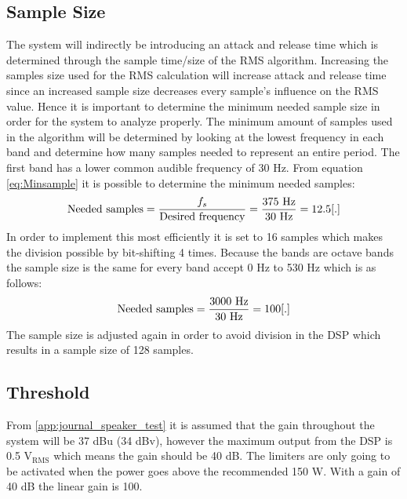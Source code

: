 \subsection*{Sample Size}
The system will indirectly be introducing an attack and release time which is determined through the sample time/size of the RMS algorithm. Increasing the samples size used for the RMS calculation will increase attack and release time since an increased sample size decreases every sample's influence on the RMS value. Hence it is important to determine the minimum needed sample size in order for the system to analyze properly. The minimum amount of samples used in the algorithm will be determined by looking at the lowest frequency in each band and determine how many samples needed to represent an entire period. The first band has a lower common audible frequency of 30 Hz. From equation \ref{eq:Minsample} it is possible to determine the minimum needed samples:
\begin{equation}\label{eq:Minsample}
\text{Needed samples} = \frac{f_s}{\text{Desired frequency}} = \frac{375 \text{ Hz}}{30 \text{ Hz}} = 12.5 \enhed{.}
\end{equation} 
In order to implement this most efficiently it is set to 16 samples which makes the division possible by bit-shifting 4 times. Because the bands are octave bands the sample size is the same for every band accept 0 Hz to 530 Hz which is as follows:
\begin{equation}
\text{Needed samples} = \frac{3000 \text{ Hz}}{30 \text{ Hz}} = 100 \enhed{.}
\end{equation} 
The sample size is adjusted again in order to avoid division in the DSP which results in a sample size of 128 samples. 

\subsection*{Threshold}
From \autoref{app:journal_speaker_test} it is assumed that the gain throughout the system will be 37 dBu (34 dBv), however the maximum output from the DSP is 0.5 $\text{V}_\text{RMS}$ which means the gain should be 40 dB. The limiters are only going to be activated when the power goes above the recommended 150 W. With a gain of 40 dB the linear gain is 100.

